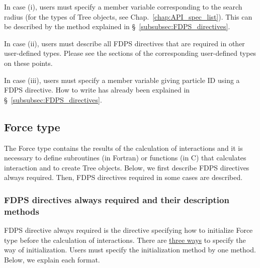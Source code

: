 In case (i), users must specify a member variable corresponding to the search radius (for the types of Tree objects, see Chap.~\ref{chap:API_spec_list}). This can be described by the method explained in \S~\ref{subsubsec:FDPS_directives}.

In case (ii), users must describe all FDPS directives that are required in other user-defined types. Please see the sections of the corresponding user-defined types on these points.

In case (iii), users must specify a member variable giving particle ID using a FDPS directive. How to write has already been explained in \S~\ref{subsubsec:FDPS_directives}.

\subsection{Force type}
\label{subsec:Force}
The Force type contains the results of the calculation of interactions and it is necessary to define subroutines {\small (in Fortran)} or functions {\small (in C)} that calculates interaction and to create Tree objects. Below, we first describe FDPS directives always required. Then, FDPS directives required in some cases are described.

\subsubsection{FDPS directives always required and their description methods}
FDPS directive always required is the directive specifying how to initialize Force type before the calculation of interactions. There are \uline{three ways} to specify the way of initialization. Users must specify the initialization method by one method. Below, we explain each format.

